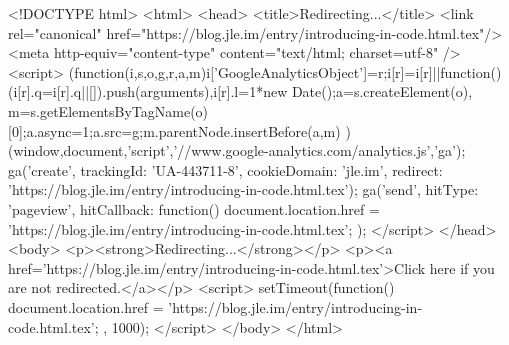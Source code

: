 <!DOCTYPE html>
<html>
<head>
<title>Redirecting...</title>
<link rel="canonical" href="https://blog.jle.im/entry/introducing-in-code.html.tex"/>
<meta http-equiv="content-type" content="text/html; charset=utf-8" />
<script>
(function(i,s,o,g,r,a,m){i['GoogleAnalyticsObject']=r;i[r]=i[r]||function(){
(i[r].q=i[r].q||[]).push(arguments)},i[r].l=1*new Date();a=s.createElement(o),
m=s.getElementsByTagName(o)[0];a.async=1;a.src=g;m.parentNode.insertBefore(a,m)
})(window,document,'script','//www.google-analytics.com/analytics.js','ga');
ga('create', { trackingId: 'UA-443711-8', cookieDomain: 'jle.im', redirect: 'https://blog.jle.im/entry/introducing-in-code.html.tex'});
ga('send', { hitType: 'pageview', hitCallback: function() { document.location.href = 'https://blog.jle.im/entry/introducing-in-code.html.tex'; } });
</script>
</head>
<body>
  <p><strong>Redirecting...</strong></p>
  <p><a href='https://blog.jle.im/entry/introducing-in-code.html.tex'>Click here if you are not redirected.</a></p>
  <script>
    setTimeout(function() { document.location.href = 'https://blog.jle.im/entry/introducing-in-code.html.tex'; }, 1000);
  </script>
</body>
</html>

